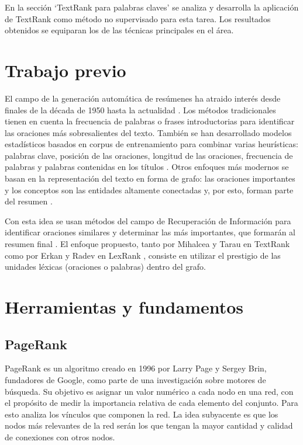 \documentclass[a4paper]{article}
\begin{document}
En la sección ‘TextRank para palabras claves’ se analiza y desarrolla la aplicación de TextRank como método no supervisado para esta tarea. Los resultados obtenidos se equiparan los de las técnicas principales en el área.


\section{Trabajo previo}
El campo de la generación automática de resúmenes ha atraido interés desde finales de la década de 1950 hasta la actualidad \cite{luhn}. Los métodos tradicionales tienen en cuenta la frecuencia de palabras o frases introductorias para identificar las oraciones más sobresalientes del texto. También se han desarrollado modelos estadísticos basados en corpus de entrenamiento para combinar varias heurísticas: palabras clave, posición de las oraciones, longitud de las oraciones, frecuencia de palabras y palabras contenidas en los títulos \cite{hovy}. Otros enfoques más modernos se basan en la representación del texto en forma de grafo: las oraciones importantes y los conceptos son las entidades altamente conectadas y, por esto, forman parte del resumen \cite{barzilay}. 

Con esta idea se usan métodos del campo de Recuperación de Información para identificar oraciones similares y determinar las más importantes, que formarán al resumen final \cite{salton}. El enfoque propuesto, tanto por Mihalcea y Tarau en TextRank \cite{mihalcea-tarau} como por Erkan y Radev en LexRank \cite{erkan}, consiste en utilizar el prestigio de las unidades léxicas (oraciones o palabras) dentro del grafo.


\section{Herramientas y fundamentos}

\subsection{PageRank}
PageRank es un algoritmo creado en 1996 por Larry Page y Sergey Brin, fundadores de Google, como parte de una investigación sobre motores de búsqueda. Su objetivo es asignar un valor numérico a cada nodo en una red, con el propósito de medir la importancia relativa de cada elemento del conjunto. Para esto analiza los vínculos que componen la red. La idea subyacente es que los nodos más relevantes de la red serán los que tengan la mayor cantidad y calidad de conexiones con otros nodos.
\end{document}
